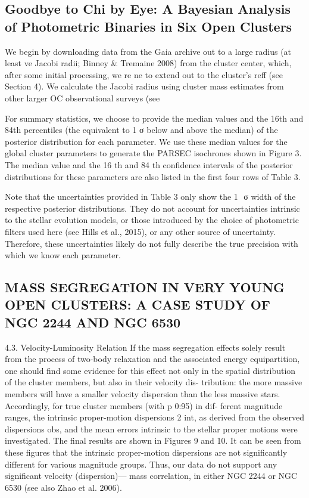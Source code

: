 \documentclass[../main.tex]{subfiles}
\begin{document}
{\subsection{Goodbye to Chi by Eye: A Bayesian Analysis of Photometric Binaries in Six Open Clusters}

We begin by downloading data from the Gaia archive out to
a large radius (at least ve Jacobi radii; Binney &
Tremaine 2008) from the cluster center, which, after some
initial processing, we re ne to extend out to the cluster’s reff
(see Section 4). We calculate the Jacobi radius using cluster
mass estimates from other larger OC observational surveys (see

For summary statistics, we choose to provide the median values and the 16th and 84th percentiles (the equivalent to 1
σ
below and above the median) of the posterior distribution for each parameter. We use these median values for the global cluster parameters to generate the PARSEC isochrones shown in Figure 3. The median value and the
16
th
and
84
th
confidence intervals of the posterior distributions for these parameters are also listed in the first four rows of Table 3.

Note that the uncertainties provided in Table 3 only show the
1
⁢
σ
width of the respective posterior distributions. They do not account for uncertainties intrinsic to the stellar evolution models, or those introduced by the choice of photometric filters used here (see Hills et al., 2015), or any other source of uncertainty. Therefore, these uncertainties likely do not fully describe the true precision with which we know each parameter.

\subsection{MASS SEGREGATION IN VERY YOUNG OPEN CLUSTERS:
	A CASE STUDY OF NGC 2244 AND NGC 6530}

4.3. Velocity-Luminosity Relation
If the mass segregation effects solely result from the process of
two-body relaxation and the associated energy equipartition, one
should find some evidence for this effect not only in the spatial
distribution of the cluster members, but also in their velocity dis-
tribution: the more massive members will have a smaller velocity
dispersion than the less massive stars.
Accordingly, for true cluster members (with p 0:95) in dif-
ferent magnitude ranges, the intrinsic proper-motion dispersions 2
int, as derived from the observed dispersions obs, and the mean
errors intrinsic to the stellar proper motions were investigated.
The final results are shown in Figures 9 and 10. It can be seen
from these figures that the intrinsic proper-motion dispersions
are not significantly different for various magnitude groups. Thus,
our data do not support any significant velocity (dispersion)—
mass correlation, in either NGC 2244 or NGC 6530 (see also Zhao
et al. 2006).

}
\end{document}
